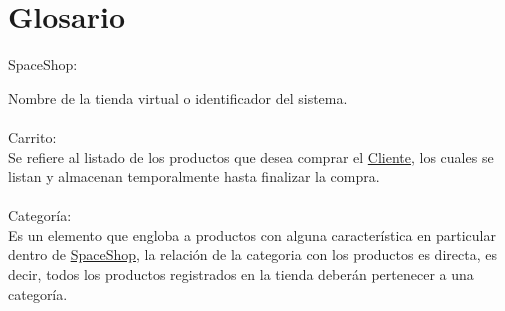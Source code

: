 \chapter{Glosario}

\hypertarget{SpaceShop}{SpaceShop:} Nombre de la tienda virtual o identificador del sistema. \\ \\

\hypertarget{carrito}{Carrito:} \\
	Se refiere al listado de los productos que desea comprar el \hyperlink{Cliente}{Cliente}, los cuales se listan y almacenan temporalmente hasta finalizar la compra. \\\\
	
\hypertarget{Categoria}{Categor\'ia:} \\
	Es un elemento que engloba a productos con alguna caracter\'istica en particular dentro de \hyperlink{SpaceShop}{SpaceShop}, la relaci\'on de la categoria con los productos es directa, es decir, todos los productos registrados en la tienda deber\'an pertenecer a una categor\'ia.
